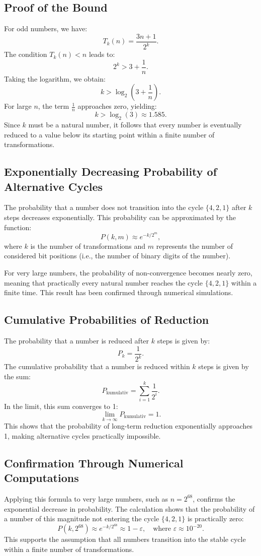 \documentclass[a4paper,12pt]{article}
\begin{document}
\subsection{Proof of the Bound}
For odd numbers, we have:
\[
T_k(n) = \frac{3n + 1}{2^k}.
\]
The condition \( T_k(n) < n \) leads to:
\[
2^k > 3 + \frac{1}{n}.
\]
Taking the logarithm, we obtain:
\[
k > \log_2(3 + \frac{1}{n}).
\]
For large \( n \), the term \( \frac{1}{n} \) approaches zero, yielding:
\[
k > \log_2(3) \approx 1.585.
\]
Since \( k \) must be a natural number, it follows that every number is eventually reduced to a value below its starting point within a finite number of transformations.

\subsection{Exponentially Decreasing Probability of Alternative Cycles}
The probability that a number does not transition into the cycle \( \{4,2,1\} \) after \( k \) steps decreases exponentially. This probability can be approximated by the function:
\[
P(k, m) \approx e^{-k/2^m},
\]
where \( k \) is the number of transformations and \( m \) represents the number of considered bit positions (i.e., the number of binary digits of the number).

For very large numbers, the probability of non-convergence becomes nearly zero, meaning that practically every natural number reaches the cycle \( \{4,2,1\} \) within a finite time. This result has been confirmed through numerical simulations.

\subsection{Cumulative Probabilities of Reduction}
The probability that a number is reduced after \( k \) steps is given by:
\[
P_k = \frac{1}{2^k}.
\]
The cumulative probability that a number is reduced within \( k \) steps is given by the sum:
\[
P_{\text{kumulativ}} = \sum_{i=1}^k \frac{1}{2^i}.
\]
In the limit, this sum converges to 1:
\[
\lim_{k \to \infty} P_{\text{kumulativ}} = 1.
\]
This shows that the probability of long-term reduction exponentially approaches 1, making alternative cycles practically impossible.

\subsection{Confirmation Through Numerical Computations}
Applying this formula to very large numbers, such as \( n = 2^{68} \), confirms the exponential decrease in probability. The calculation shows that the probability of a number of this magnitude not entering the cycle \( \{4,2,1\} \) is practically zero:
\[
P(k, 2^{68}) \approx e^{-k/2^{68}} \approx 1 - \varepsilon, \quad \text{where } \varepsilon \approx 10^{-20}.
\]
This supports the assumption that all numbers transition into the stable cycle within a finite number of transformations.
\end{document}
